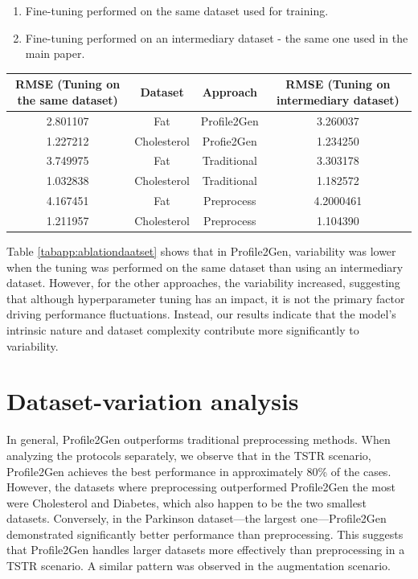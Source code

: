 \documentclass{article}
\theoremstyle{plain}
\theoremstyle{definition}
\theoremstyle{remark}
\begin{document}
\begin{enumerate}
    \item  Fine-tuning performed on the same dataset used for training.
\item Fine-tuning performed on an intermediary dataset - the same one used in the main paper.
\end{enumerate}

\begin{tabular}{c|c|c|c} \label{tabapp:ablationdaatset}
  RMSE (Tuning on the same dataset)   & Dataset & Approach &  RMSE (Tuning on intermediary dataset)\\
     \hline
     2.801107 & Fat & Profile2Gen & 3.260037 \\
     1.227212 & Cholesterol & Profie2Gen & 1.234250\\
     3.749975 & Fat & Traditional & 3.303178\\
     1.032838 & Cholesterol & Traditional & 1.182572\\
     4.167451 &Fat &  Preprocess & 4.2000461\\
     1.211957 & Cholesterol & Preprocess & 1.104390\\
\end{tabular}

Table \ref{tabapp:ablationdaatset} shows that in Profile2Gen, variability was lower when the tuning was performed on the same dataset than using an intermediary dataset. However, for the other approaches, the variability increased, suggesting that although hyperparameter tuning has an impact, it is not the primary factor driving performance fluctuations. Instead, our results indicate that the model’s intrinsic nature and dataset complexity contribute more significantly to variability.


\section{Dataset-variation analysis} \label{appsec:datasetsimpact}

In general, Profile2Gen outperforms traditional preprocessing methods. When analyzing the protocols separately, we observe that in the TSTR scenario, Profile2Gen achieves the best performance in approximately 80\% of the cases. However, the datasets where preprocessing outperformed Profile2Gen the most were Cholesterol and Diabetes, which also happen to be the two smallest datasets. Conversely, in the Parkinson dataset—the largest one—Profile2Gen demonstrated significantly better performance than preprocessing. This suggests that Profile2Gen handles larger datasets more effectively than preprocessing in a TSTR scenario.
A similar pattern was observed in the augmentation scenario.
\end{document}
